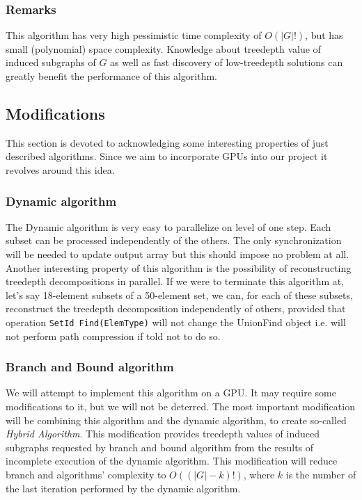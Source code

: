 \subsubsection{Remarks}
This algorithm has very high pessimistic time complexity of $O\left(\left|G\right|!\right)$, but has small (polynomial) space complexity. Knowledge about treedepth value of induced subgraphs of $G$ as well as fast discovery of low-treedepth solutions can greatly benefit the performance of this algorithm.
\subsection{Modifications}
This section is devoted to acknowledging some interesting properties of just described algorithms. Since we aim to incorporate GPUs into our project it revolves around this idea.
\subsubsection{Dynamic algorithm}
The Dynamic algorithm is very easy to parallelize on level of one step. Each subset can be processed independently of the others. The only synchronization will be needed to update output array but this should impose no problem at all. Another interesting property of this algorithm is the possibility of reconstructing treedepth decompositions in parallel. If we were to terminate this algorithm at, let's say 18-element subsets of a 50-element set, we can, for each of these subsets, reconstruct the treedepth decomposition independently of others, provided that operation \texttt{SetId Find(ElemType)} will not change the UnionFind object i.e. will not perform path compression if told not to do so.
\subsubsection{Branch and Bound algorithm}
We will attempt to implement this algorithm on a GPU. It may require some modifications to it, but we will not be deterred. The most important modification will be combining this algorithm and the dynamic algorithm, to create so-called \emph{Hybrid Algorithm}. This modification provides treedepth values of induced subgraphs requested by branch and bound algorithm from the results of incomplete execution of the dynamic algorithm. This modification will reduce branch and algorithms' complexity to $O\left(\left(\left|G\right|-k\right)!\right)$, where $k$ is the number of the last iteration performed by the dynamic algorithm.
